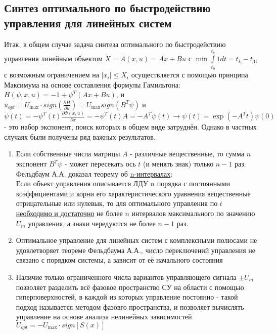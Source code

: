 \documentclass[preprint,russian,a5paper,10pt,twoside,mediummath]{ncc}
\begin{document}
	\subsection{Синтез оптимального по быстродействию управления для линейных систем\label{maximum:fastest}}
 Итак, в общем случае задача синтеза оптимального по быстродействию управления линейным объектом $\dot{X}=A\left( x,u \right)=Ax+Bu$ с $\min \int\limits_{{{t}_{0}}}^{{{t}_{k}}}{1dt={{t}_{k}}-{{t}_{0}}}$, с возможным ограничением на $\left| {{x}_{i}} \right|\le {{X}_{i}}$ осуществляется с помощью принципа Максимума на основе составления формулы Гамильтона: $H\left( \psi ,x,u \right)=-1+{{\psi }^{T}}\left( Ax+Bu \right)$, и ${{u}_{opt}}={{U}_{\max }}\cdot sign\left( \frac{\partial H}{\partial u} \right)={{U}_{\max }}sign\left( {{B}^{T}}\psi  \right)$ и  $\dot{\psi }\left( t \right)=-{{\psi }^{T}}\left( t \right)\frac{\partial \Phi \left( x,u \right)}{\partial x}=-{{\psi }^{T}}\left( t \right)A=-{{A}^{T}}\psi \left( t \right)\to \psi \left( t \right)=\exp \left( -{{A}^{T}}t \right)\psi \left( 0 \right)$ - это набор экспонент, поиск которых в общем виде затруднён. Однако в частных случаях были получены ряд важных результатов.
\begin{enumerate}
\item Если собственные числа матрицы $A$ - различные вещественные, то сумма $n$ экспонент ${{B}^{T}}\psi $ - может пересекать ось $t$ (и менять знак) только $n-1$ раз.   Фельдбаум А.А. доказал теорему об \underline{n-интервалах}:
\\Если объект управления описывается ЛДУ $n$ порядка с постоянными коэффициентами и корни его характеристического уравнения вещественные отрицательные или нулевык, то для оптимального управления по $t$ \underline{необходимо и достаточно} не более $n$ интервалов максимального по значению ${{U}_{m}}$ управления, а знаки чередуются не более $n-1$ раз.
\item Оптимальное управление для линейных систем с комплексными полюсами не удовлетворяет теореме Фельдбаума А.А., число переключений управления не связано с порядком системы, а зависит от её начального состояния
\item Наличие только ограниченного числа вариантов управляющего сигнала $\pm {{U}_{m}}$ позволяет разделить всё фазовое пространство СУ на области с помощью гиперповерхностей, в каждой из которых управление постоянно - такой подход называется методом фазовго пространства, и позволяет вычислять управление на основе анализа нелинейных зависимостей   ${{U}_{opt}}=-{{U}_{\max }}\cdot sign\left[ S\left( x \right) \right]$
\end{enumerate}
\end{document}
